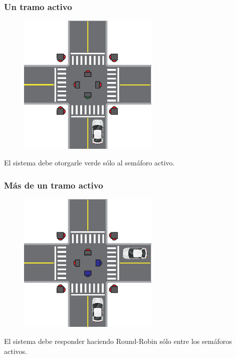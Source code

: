 \begin{frame}
\frametitle{Un tramo activo}
\begin{figure}[htbp]
	\centering
	\includegraphics[width=0.60\textwidth]{diagramas/un-activo.eps}
\end{figure}
El sistema debe otorgarle verde sólo al semáforo activo.
\end{frame}

\begin{frame}
\frametitle{Más de un tramo activo}
\begin{figure}[htbp]
	\centering
	\includegraphics[width=0.60\textwidth]{diagramas/dos-activos.eps}
\end{figure}
El sistema debe responder haciendo Round-Robin sólo entre los semáforos activos.
\end{frame}

